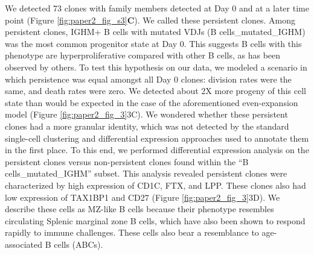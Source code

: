We detected 73 clones with family members detected at Day 0 and at a later time point (Figure \ref{fig:paper2_fig_s3}\textbf{C}). We called these persistent clones. Among persistent clones, IGHM+ B cells with mutated VDJs (B cells\_mutated\_IGHM) was the most common progenitor state at Day 0. This suggests B cells with this phenotype are hyperproliferative compared with other B cells, as has been observed by others\cite{seifert_functional_2015}. To test this hypothesis on our data, we modeled a scenario in which persistence was equal amongst all Day 0 clones: division rates were the same, and death rates were zero. We detected about 2X more progeny of this cell state than would be expected in the case of the aforementioned even-expansion model (Figure \ref{fig:paper2_fig_3}3C). We wondered whether these persistent clones had a more granular identity, which was not detected by the standard single-cell clustering and differential expression approaches used to annotate them in the first place. To this end, we performed differential expression analysis on the persistent clones versus non-persistent clones found within the “B cells\_mutated\_IGHM” subset. This analysis revealed persistent clones were characterized by high expression of CD1C, FTX, and LPP. These clones also had low expression of TAX1BP1 and CD27 (Figure \ref{fig:paper2_fig_3}3D). We describe these cells as MZ-like B cells because their phenotype resembles circulating Splenic marginal zone B cells, which have also been shown to respond rapidly to immune challenges\cite{weller_human_2004}. These cells also bear a resemblance to age-associated B cells (ABCs)\cite{cancro_age-associated_2020}.


